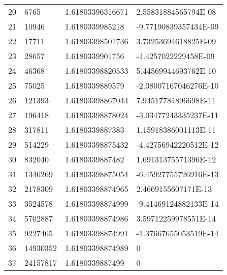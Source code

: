 \begin{longtable}{llll}
20	&	6765	&	1.61803396316671	&	2.55831884565794E-08	\\
21	&	10946	&	1.6180339985218	&	-9.77190839357434E-09	\\
22	&	17711	&	1.61803398501736	&	3.73253694618825E-09	\\
23	&	28657	&	1.6180339901756	&	-1.4257022229458E-09	\\
24	&	46368	&	1.61803398820533	&	5.44569944693762E-10	\\
25	&	75025	&	1.6180339889579	&	-2.08007167046276E-10	\\
26	&	121393	&	1.61803398867044	&	7.94517784896698E-11	\\
27	&	196418	&	1.61803398878024	&	-3.03477243335237E-11	\\
28	&	317811	&	1.6180339887383	&	1.15918386001113E-11	\\
29	&	514229	&	1.61803398875432	&	-4.42756942220512E-12	\\
30	&	832040	&	1.6180339887482	&	1.69131375571396E-12	\\
31	&	1346269	&	1.61803398875054	&	-6.45927755726916E-13	\\
32	&	2178309	&	1.61803398874965	&	2.4669155607171E-13	\\
33	&	3524578	&	1.61803398874999	&	-9.41469124882133E-14	\\
34	&	5702887	&	1.61803398874986	&	3.59712259978551E-14	\\
35	&	9227465	&	1.61803398874991	&	-1.37667655053519E-14	\\
36	&	14930352	&	1.61803398874989	&	0	\\
37	&	24157817	&	1.6180339887499	&	0	\\
\end{longtable}

